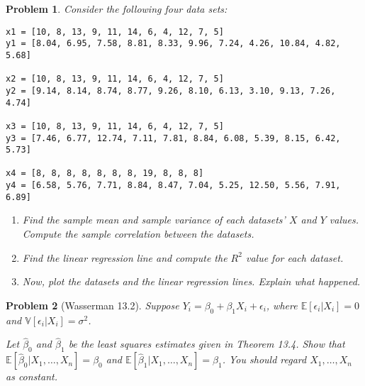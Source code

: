 \documentclass{article}
\newtheorem{problem}{Problem}
\newcommand{\EE}{\mathbb{E}}
\newcommand{\VV}{\mathbb{V}}
\begin{document}
\begin{problem}
Consider the following four data sets:

    \begin{lstlisting}
x1 = [10, 8, 13, 9, 11, 14, 6, 4, 12, 7, 5]
y1 = [8.04, 6.95, 7.58, 8.81, 8.33, 9.96, 7.24, 4.26, 10.84, 4.82, 5.68]

x2 = [10, 8, 13, 9, 11, 14, 6, 4, 12, 7, 5]
y2 = [9.14, 8.14, 8.74, 8.77, 9.26, 8.10, 6.13, 3.10, 9.13, 7.26, 4.74]

x3 = [10, 8, 13, 9, 11, 14, 6, 4, 12, 7, 5]
y3 = [7.46, 6.77, 12.74, 7.11, 7.81, 8.84, 6.08, 5.39, 8.15, 6.42, 5.73]

x4 = [8, 8, 8, 8, 8, 8, 8, 19, 8, 8, 8]
y4 = [6.58, 5.76, 7.71, 8.84, 8.47, 7.04, 5.25, 12.50, 5.56, 7.91, 6.89]

    \end{lstlisting}

\begin{enumerate}[label=(\alph*),topsep=0pt]
    \item Find the sample mean and sample variance of each datasets' $X$ and $Y$ values. Compute the sample correlation between the datasets.
    \item Find the linear regression line and compute the $R^2$ value for each dataset.
    \item Now, plot the datasets and the linear regression lines. Explain what happened.
\end{enumerate}
\end{problem}

\begin{problem}[Wasserman 13.2]
    Suppose $Y_i = \beta_0 + \beta_1 X_i + \epsilon_i$, where $\EE[\epsilon_i | X_i] = 0$ and $\VV[\epsilon_i | X_i] = \sigma^2$.

    Let $\hat{\beta}_0$ and $\hat{\beta}_1$ be the least squares estimates given in Theorem 13.4.
    Show that $\EE[\hat{\beta}_0|X_1, \ldots, X_n] = \beta_0$ and $\EE[\hat{\beta}_1|X_1, \ldots, X_n] = \beta_1$.
    You should regard $X_1, \ldots, X_n$ as constant.
\end{problem}
\end{document}

